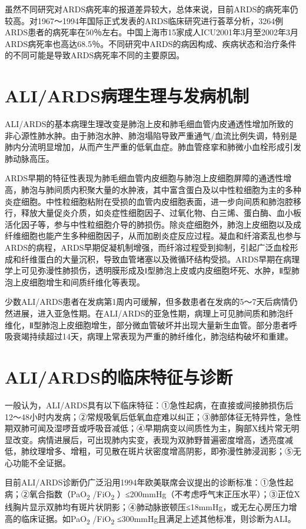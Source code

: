 虽然不同研究对ARDS病死率的报道差异较大，总体来说，目前ARDS的病死率仍较高。对1967～1994年国际正式发表的ARDS临床研究进行荟萃分析，3264例ARDS患者的病死率在50％左右。中国上海市15家成人ICU2001年3月至2002年3月ARDS病死率也高达68.5％。不同研究中ARDS的病因构成、疾病状态和治疗条件的不同可能是导致ARDS病死率不同的主要原因。

\section{ALI/ARDS病理生理与发病机制}

ALI/ARDS的基本病理生理改变是肺泡上皮和肺毛细血管内皮通透性增加所致的非心源性肺水肿。由于肺泡水肿、肺泡塌陷导致严重通气/血流比例失调，特别是肺内分流明显增加，从而产生严重的低氧血症。肺血管痉挛和肺微小血栓形成引发肺动脉高压。

ARDS早期的特征性表现为肺毛细血管内皮细胞与肺泡上皮细胞屏障的通透性增高，肺泡与肺间质内积聚大量的水肿液，其中富含蛋白及以中性粒细胞为主的多种炎症细胞。中性粒细胞粘附在受损的血管内皮细胞表面，进一步向间质和肺泡腔移行，释放大量促炎介质，如炎症性细胞因子、过氧化物、白三烯、蛋白酶、血小板活化因子等，参与中性粒细胞介导的肺损伤。除炎症细胞外，肺泡上皮细胞以及成纤维细胞也能产生多种细胞因子，从而加剧炎症反应过程。凝血和纤溶紊乱也参与ARDS的病程，ARDS早期促凝机制增强，而纤溶过程受到抑制，引起广泛血栓形成和纤维蛋白的大量沉积，导致血管堵塞以及微循环结构受损。ARDS早期在病理学上可见弥漫性肺损伤，透明膜形成及Ⅰ型肺泡上皮或内皮细胞坏死、水肿，Ⅱ型肺泡上皮细胞增生和间质纤维化等表现。

少数ALI/ARDS患者在发病第1周内可缓解，但多数患者在发病的5～7天后病情仍然进展，进入亚急性期。在ALI/ARDS的亚急性期，病理上可见肺间质和肺泡纤维化，Ⅱ型肺泡上皮细胞增生，部分微血管破坏并出现大量新生血管。部分患者呼吸衰竭持续超过14天，病理上常表现为严重的肺纤维化，肺泡结构破坏和重建。

\section{ALI/ARDS的临床特征与诊断}

一般认为，ALI/ARDS具有以下临床特征：①急性起病，在直接或间接肺损伤后12～48小时内发病；②常规吸氧后低氧血症难以纠正；③肺部体征无特异性，急性期双肺可闻及湿啰音或呼吸音减低；④早期病变以间质性为主，胸部X线片常无明显改变。病情进展后，可出现肺内实变，表现为双肺野普遍密度增高，透亮度减低，肺纹理增多、增粗，可见散在斑片状密度增高阴影，即弥漫性肺浸润影；⑤无心功能不全证据。

目前ALI/ARDS诊断仍广泛沿用1994年欧美联席会议提出的诊断标准：①急性起病；②氧合指数（PaO\textsubscript{2}
/FiO\textsubscript{2}
）≤200mmHg（不考虑呼气末正压水平）；③正位X线胸片显示双肺均有斑片状阴影；④肺动脉嵌顿压≤18mmHg，或无左心房压力增高的临床证据。如PaO\textsubscript{2}
/FiO\textsubscript{2} ≤300mmHg且满足上述其他标准，则诊断为ALI。

